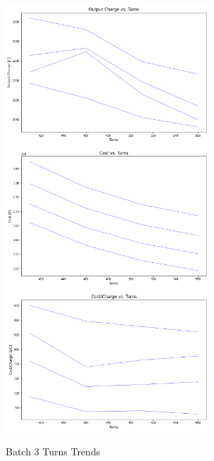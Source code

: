 \begin{figure}
    \begin{center}
    \includegraphics[width=3in]{fig30.png}
    \end{center}
    \renewcommand{\baselinestretch}{1}
    \small\normalsize
    \begin{quote}
    \caption[Batch 3 Turns Trends]{Batch 3 Turns Trends} \label{fig: f30}
    \end{quote}
\end{figure}

